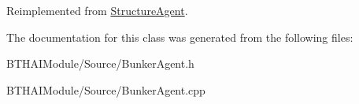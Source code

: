 Reimplemented from \hyperlink{class_structure_agent_adac3c70b613e6d10ac921e11bb89b633}{StructureAgent}.



The documentation for this class was generated from the following files:\begin{DoxyCompactItemize}
\item 
BTHAIModule/Source/BunkerAgent.h\item 
BTHAIModule/Source/BunkerAgent.cpp\end{DoxyCompactItemize}
